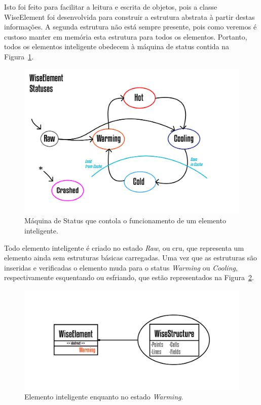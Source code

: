 \documentclass[
        english,			
        brazil			        %
        ,<...>]{abntbibufjf}
\begin{document}
Isto foi feito para facilitar a leitura e escrita de objetos, pois a classe WiseElement foi desenvolvida para construir a estrutura abstrata à partir destas informações. A segunda estrutura não está sempre presente, pois como veremos é custoso manter em memória esta estrutura para todos os elementos. Portanto, todos os elementos inteligente obedecem à máquina de status contida na Figura~\ref{fig3:wiselementstatus}.

\begin{figure}[!htbp]
	\centering
	\includegraphics[scale=1]{Figures/WiseElementStatus.png}
	\caption{Máquina de Status que contola o funcionamento de um elemento inteligente.}
	\label{fig3:wiselementstatus}
\end{figure}

Todo elemento inteligente é criado no estado \textit{Raw}, ou cru, que representa um elemento ainda sem estruturas básicas carregadas. Uma vez que as estruturas são inseridas e verificadas o elemento muda para o status \textit{Warming} ou \textit{Cooling}, respectivamente esquentando ou esfriando, que estão representados na Figura~\ref{fig4:wiselementwarming}.

\begin{figure}[!htbp]
	\centering
	\includegraphics[scale=1]{Figures/WiseElementWarming.png}
	\caption{Elemento inteligente enquanto no estado \textit{Warming}.}
	\label{fig4:wiselementwarming}
\end{figure}
\end{document}
